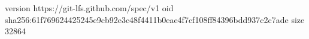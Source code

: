 version https://git-lfs.github.com/spec/v1
oid sha256:61f769624425245e9cb92e3c48f4411b0eae4f7cf108ff84396bdd937c2c7ade
size 32864
